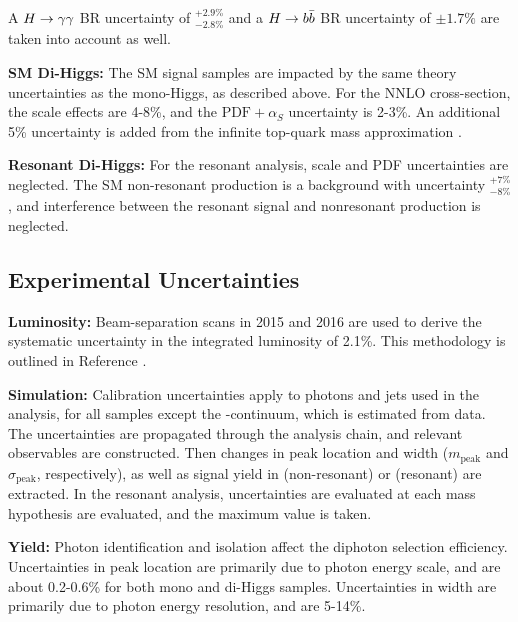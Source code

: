 A $H\rightarrow \gamma\gamma$ \gls{BR} uncertainty of $^{+2.9\%}_{-2.8\%}$ and a $H\rightarrow b\bar{b}$ \gls{BR} uncertainty of $\pm1.7\%$ \cite{hh-crosssections} are taken into account as well.

\noindent\textbf{\gls{SM} Di-Higgs:} The \gls{SM} \hh signal samples are impacted by the same theory uncertainties as the mono-Higgs, as described above. For the \gls{NNLO} cross-section, the scale effects are 4-8\%, and the $\text{PDF}+\alpha_{S}$ uncertainty is 2-3\%. An additional 5\% uncertainty is added from the infinite top-quark mass approximation \cite{nnlo-topquark}.

\noindent\textbf{Resonant Di-Higgs:} For the resonant analysis, scale and \gls{PDF} uncertainties are neglected. The \gls{SM} non-resonant \hh production is a background with uncertainty $^{+7\%}_{-8\%}$, and interference between the resonant \hh signal and nonresonant \hh production is neglected.

\subsection{Experimental Uncertainties} \label{ssec:exp-unc}

\noindent\textbf{Luminosity:} Beam-separation scans in 2015 and 2016 are used to derive the systematic uncertainty in the integrated luminosity of 2.1\%. This methodology is outlined in Reference \cite{lumi-unc}.


\noindent\textbf{Simulation:} Calibration uncertainties apply to photons and jets used in the analysis, for all samples except the \yy-continuum, which is estimated from data. The uncertainties are propagated through the analysis chain, and relevant observables are constructed. Then changes in peak location and width ($m_{\text{peak}}$ and $\sigma_{\text{peak}}$, respectively), as well as signal yield in \myy (non-resonant) or \myybb (resonant) are extracted. In the resonant analysis, uncertainties are evaluated at each mass hypothesis are evaluated, and the maximum value is taken.

\noindent\textbf{Yield:} Photon identification and isolation affect the diphoton selection efficiency. Uncertainties in peak location are primarily due to photon energy scale, and are about 0.2-0.6\% for both mono and di-Higgs samples. Uncertainties in width are primarily due to photon energy resolution, and are 5-14\%. 

